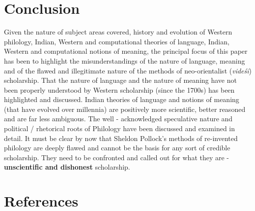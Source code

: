 \section*{Conclusion}

Given the nature of subject areas covered, history and evolution of Western philology, Indian, Western and computational theories of language, Indian, Western and computational notions of meaning, the principal focus of this paper has been to highlight the misunderstandings of the nature of language, meaning and of the flawed and illegitimate nature of the methods of neo-orientalist (\textit{videśī}) scholarship. That the nature of language and the nature of meaning have not been properly understood by Western scholarship (since the 1700s) has been highlighted and discussed. Indian theories of language and notions of meaning (that have evolved over millennia) are positively more scientific, better reasoned and are far less ambiguous. The well - acknowledged speculative nature and political / rhetorical roots of Philology have been discussed and examined in detail. It must be clear by now that Sheldon Pollock’s methods of re-invented philology are deeply flawed and cannot be the basis for any sort of credible scholarship. They need to be confronted and called out for what they are - \textbf{unscientific and dishonest} scholarship.

\newpage


\section*{References}

